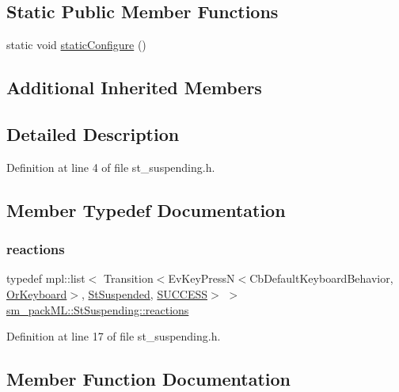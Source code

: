 \subsection*{Static Public Member Functions}
\begin{DoxyCompactItemize}
\item 
static void \hyperlink{structsm__packML_1_1StSuspending_a093cc3c1f8a1db5eed1d1af86b548852}{static\+Configure} ()
\end{DoxyCompactItemize}
\subsection*{Additional Inherited Members}


\subsection{Detailed Description}


Definition at line 4 of file st\+\_\+suspending.\+h.



\subsection{Member Typedef Documentation}
\mbox{\label{structsm__packML_1_1StSuspending_a7d125f0546ec2381647db59d49f706b7}} 
\subsubsection{\texorpdfstring{reactions}{reactions}}
{\footnotesize\ttfamily typedef mpl\+::list$<$ Transition$<$Ev\+Key\+PressN$<$Cb\+Default\+Keyboard\+Behavior, \hyperlink{classsm__packML_1_1OrKeyboard}{Or\+Keyboard}$>$, \hyperlink{structsm__packML_1_1StSuspended}{St\+Suspended}, \hyperlink{classSUCCESS}{S\+U\+C\+C\+E\+SS}$>$ $>$ \hyperlink{structsm__packML_1_1StSuspending_a7d125f0546ec2381647db59d49f706b7}{sm\+\_\+pack\+M\+L\+::\+St\+Suspending\+::reactions}}



Definition at line 17 of file st\+\_\+suspending.\+h.



\subsection{Member Function Documentation}
\mbox{\label{structsm__packML_1_1StSuspending_a5c6c8a89752377395f61d822a2239f80}} 
